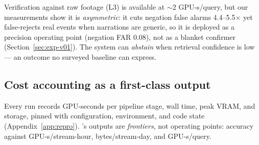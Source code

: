 Verification against raw footage (L3) is available at $\sim$2 GPU-s/query, but our measurements show it is \emph{asymmetric}: it cuts negation false alarms 4.4--5.5$\times$ yet false-rejects real events when narrations are generic, so it is deployed as a precision operating point (negation FAR 0.08), not as a blanket confirmer (Section~\ref{sec:exp-v01}). The system can \emph{abstain} when retrieval confidence is low --- an outcome no surveyed baseline can express.

\subsection{Cost accounting as a first-class output}
\label{sec:design-cost}

Every run records GPU-seconds per pipeline stage, wall time, peak VRAM, and storage, pinned with configuration, environment, and code state (Appendix~\ref{app:repro}). \sys's outputs are \emph{frontiers}, not operating points: accuracy against GPU-s/stream-hour, bytes/stream-day, and GPU-s/query.

